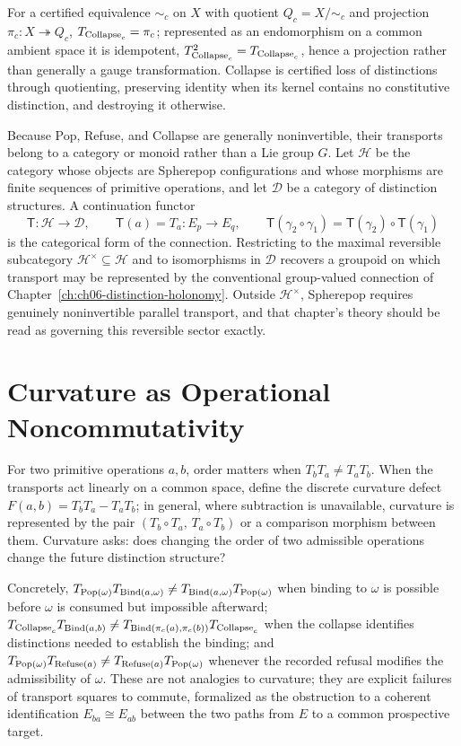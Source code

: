 For a certified equivalence $\sim_c$ on $X$ with quotient $Q_c = X/{\sim_c}$ and projection $\pi_c : X \twoheadrightarrow Q_c$, $T_{\mathrm{Collapse}_c} = \pi_c$; represented as an endomorphism on a common ambient space it is idempotent, $T_{\mathrm{Collapse}_c}^2 = T_{\mathrm{Collapse}_c}$, hence a projection rather than generally a gauge transformation. Collapse is certified loss of distinctions through quotienting, preserving identity when its kernel contains no constitutive distinction, and destroying it otherwise.

Because Pop, Refuse, and Collapse are generally noninvertible, their transports belong to a category or monoid rather than a Lie group $G$. Let $\mathcal{H}$ be the category whose objects are Spherepop configurations and whose morphisms are finite sequences of primitive operations, and let $\mathcal{D}$ be a category of distinction structures. A continuation functor
\[
\mathsf{T} : \mathcal{H} \to \mathcal{D}, \qquad \mathsf{T}(a) = T_a : E_p \to E_q, \qquad \mathsf{T}(\gamma_2 \circ \gamma_1) = \mathsf{T}(\gamma_2) \circ \mathsf{T}(\gamma_1)
\]
is the categorical form of the connection. Restricting to the maximal reversible subcategory $\mathcal{H}^\times \subseteq \mathcal{H}$ and to isomorphisms in $\mathcal{D}$ recovers a groupoid on which transport may be represented by the conventional group-valued connection of Chapter~\ref{ch:ch06-distinction-holonomy}. Outside $\mathcal{H}^\times$, Spherepop requires genuinely noninvertible parallel transport, and that chapter's theory should be read as governing this reversible sector exactly.

\section{Curvature as Operational Noncommutativity}

For two primitive operations $a,b$, order matters when $T_b T_a \neq T_a T_b$. When the transports act linearly on a common space, define the discrete curvature defect $F(a,b) = T_b T_a - T_a T_b$; in general, where subtraction is unavailable, curvature is represented by the pair $(T_b \circ T_a,\, T_a \circ T_b)$ or a comparison morphism between them. Curvature asks: does changing the order of two admissible operations change the future distinction structure?

Concretely, $T_{\mathrm{Pop}(\omega)} T_{\mathrm{Bind}(a,\omega)} \neq T_{\mathrm{Bind}(a,\omega)} T_{\mathrm{Pop}(\omega)}$ when binding to $\omega$ is possible before $\omega$ is consumed but impossible afterward; $T_{\mathrm{Collapse}_c} T_{\mathrm{Bind}(a,b)} \neq T_{\mathrm{Bind}(\pi_c(a),\pi_c(b))} T_{\mathrm{Collapse}_c}$ when the collapse identifies distinctions needed to establish the binding; and $T_{\mathrm{Pop}(\omega)} T_{\mathrm{Refuse}(a)} \neq T_{\mathrm{Refuse}(a)} T_{\mathrm{Pop}(\omega)}$ whenever the recorded refusal modifies the admissibility of $\omega$. These are not analogies to curvature; they are explicit failures of transport squares to commute, formalized as the obstruction to a coherent identification $E_{ba} \cong E_{ab}$ between the two paths from $E$ to a common prospective target.

